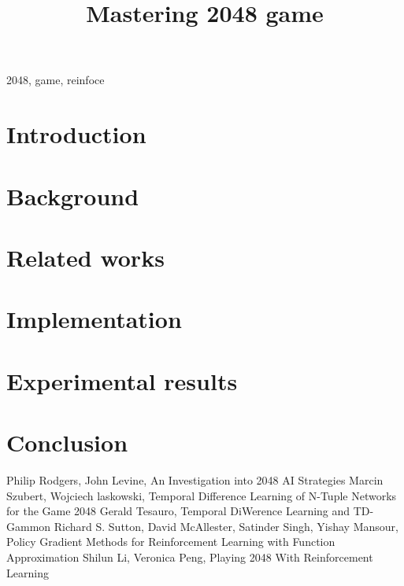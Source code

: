 \documentclass[conference]{IEEEtran}
\begin{document}
\title{Mastering 2048 game\\
}

\author{
}

\maketitle

\begin{abstract}

\end{abstract}

\begin{IEEEkeywords}
2048, game, reinfoce
\end{IEEEkeywords}

\section{Introduction}


\section{Background}


\section{Related works}


\section{Implementation}


\section{Experimental results}


\section{Conclusion}


\begin{thebibliography}{00}
 Philip Rodgers, John Levine, An Investigation into 2048 AI Strategies
 Marcin Szubert, Wojciech laskowski, Temporal Difference Learning of N-Tuple Networks for the Game 2048
 Gerald Tesauro, Temporal DiWerence Learning and TD-Gammon
 Richard S. Sutton, David McAllester, Satinder Singh, Yishay Mansour, Policy Gradient Methods for Reinforcement Learning with Function Approximation
 Shilun Li, Veronica Peng, Playing 2048 With Reinforcement Learning
\end{thebibliography}
\end{document}
